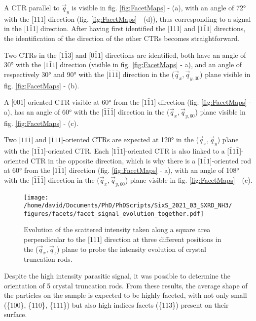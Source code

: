 A CTR parallel to $\vec{q}_y$ is visible in fig. \ref{fig:FacetMaps} - (a), with an angle of \ang{72} with the [111] direction (fig. \ref{fig:FacetMaps} - (d)), thus corresponding to a signal in the [1$\bar{1}$1] direction.
After having first identified the [111] and [$1\bar{1}1$] directions, the identification of the direction of the other CTRs becomes straightforward.

Two CTRs in the [$1\bar{1}3$] and [$0\bar{1}1$] directions are identified, both have an angle of \ang{30} with the [$1\bar{1}1$] direction (visible in  fig. \ref{fig:FacetMaps} - a), and an angle of respectively \ang{30} and \ang{90} with the [$\bar{1}\bar{1}\bar{1}$] direction in the ($\vec{q}_x, \vec{q}_{y, 30}$) plane visible in fig. \ref{fig:FacetMaps} - (b).

A [001] oriented CTR visible at \ang{60} from the [$1\bar{1}1$] direction (fig. \ref{fig:FacetMaps} - a), has an angle of \ang{60} with the [$\bar{1}\bar{1}\bar{1}$] direction in the ($\vec{q}_x, \vec{q}_{y, 60}$) plane visible in fig. \ref{fig:FacetMaps} - (c).

Two [$11\bar{1}$] and [$\bar{1}11$]-oriented CTRs are expected at \ang{120} in the ($\vec{q}_x, \vec{q}_y$) plane with the [$1\bar{1}1$]-oriented CTR.
Each [$1\bar{1}1$]-oriented CTR is also linked to a [$\bar{1}1\bar{1}$]-oriented CTR in the opposite direction, which is why there is a [$1\bar{1}1$]-oriented rod at \ang{60} from the [$1\bar{1}1$] direction (fig. \ref{fig:FacetMaps} - a), with an angle of \ang{108} with the [$\bar{1}\bar{1}\bar{1}$] direction in the ($\vec{q}_x, \vec{q}_{y, 60}$) plane visible in fig. \ref{fig:FacetMaps} - (c).

\begin{figure}[!htb]
    \centering
    \texttt{[image: /home/david/Documents/PhD/PhDScripts/SixS\_2021\_03\_SXRD\_NH3/figures/facets/facet\_signal\_evolution\_together.pdf]}
    \caption{
    Evolution of the scattered intensity taken along a square area perpendicular to the [111] direction at three different positions in the ($\vec{q}_x, \vec{q}_z$) plane to probe the intensity evolution of crystal truncation rods.
    }
    \label{fig:FacetSignal}
\end{figure}

Despite the high intensity parasitic signal, it was possible to determine the orientation of 5 crystal truncation rods.
From these results, the average shape of the particles on the sample is expected to be highly faceted, with not only small (\{100\}, \{110\}, \{111\}) but also high indices facets (\{113\}) present on their surface.

